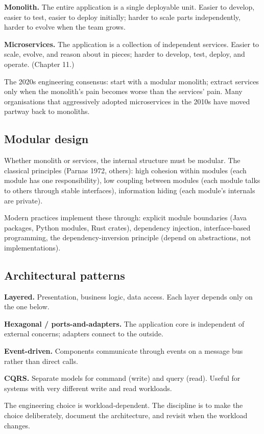 \textbf{Monolith.} The entire application is a single deployable unit. Easier to develop, easier to test, easier to deploy initially; harder to scale parts independently, harder to evolve when the team grows.

\textbf{Microservices.} The application is a collection of independent services. Easier to scale, evolve, and reason about in pieces; harder to develop, test, deploy, and operate. (Chapter 11.)

The 2020s engineering consensus: start with a modular monolith; extract services only when the monolith's pain becomes worse than the services' pain. Many organisations that aggressively adopted microservices in the 2010s have moved partway back to monoliths.

\subsection{Modular design}

Whether monolith or services, the internal structure must be modular. The classical principles (Parnas 1972, others): high cohesion within modules (each module has one responsibility), low coupling between modules (each module talks to others through stable interfaces), information hiding (each module's internals are private).

Modern practices implement these through: explicit module boundaries (Java packages, Python modules, Rust crates), dependency injection, interface-based programming, the dependency-inversion principle (depend on abstractions, not implementations).

\subsection{Architectural patterns}

\textbf{Layered.} Presentation, business logic, data access. Each layer depends only on the one below.

\textbf{Hexagonal / ports-and-adapters.} The application core is independent of external concerns; adapters connect to the outside.

\textbf{Event-driven.} Components communicate through events on a message bus rather than direct calls.

\textbf{CQRS.} Separate models for command (write) and query (read). Useful for systems with very different write and read workloads.

The engineering choice is workload-dependent. The discipline is to make the choice deliberately, document the architecture, and revisit when the workload changes.

